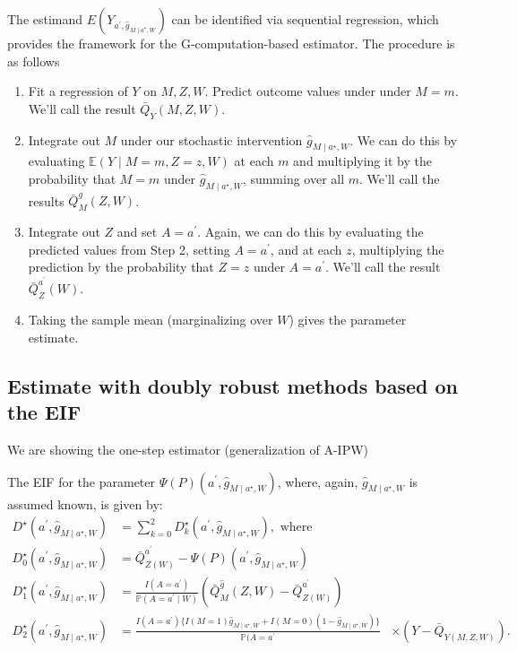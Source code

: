\documentclass[
  12pt,
]{book}
\providecommand{\tightlist}{%
  \setlength{\itemsep}{0pt}\setlength{\parskip}{0pt}}
\theoremstyle{definition}
\theoremstyle{definition}
\theoremstyle{definition}
\renewcommand{\P}{\mathbb{P}}
\newcommand{\E}{\mathbb{E}}
\newcommand{\1}{\mathbbm{1}}
\begin{document}
The estimand \(E(Y_{a^\prime, \hat{g}_{M \mid a^\star,W}})\) can be identified
via sequential regression, which provides the framework for the
G-computation-based estimator. The procedure is as follows

\begin{enumerate}
\def\labelenumi{\arabic{enumi}.}
\tightlist
\item
  Fit a regression of \(Y\) on \(M,Z,W\). Predict outcome values under under
  \(M=m\). We'll call the result \(\bar{Q}_Y(M,Z,W)\).
\item
  Integrate out \(M\) under our stochastic intervention
  \(\hat{g}_{M \mid a^{\star}, W}\). We can do this by evaluating
  \(\E(Y \mid M=m,Z=z,W)\) at each \(m\) and multiplying it by the probability
  that \(M=m\) under \(\hat{g}_{M \mid a^{\star}, W}\), summing over all \(m\).
  We'll call the results \(\bar{Q}^{g}_M(Z,W)\).
\item
  Integrate out \(Z\) and set \(A=a^\prime\). Again, we can do this by evaluating
  the predicted values from Step 2, setting \(A=a^\prime\), and at each \(z\),
  multiplying the prediction by the probability that \(Z=z\) under \(A=a^\prime\).
  We'll call the result \(\bar{Q}^{a^\prime}_Z(W)\).
\item
  Taking the sample mean (marginalizing over \(W\)) gives the parameter
  estimate.
\end{enumerate}

\hypertarget{estimate-with-doubly-robust-methods-based-on-the-eif}{%
\subsection{Estimate with doubly robust methods based on the EIF}\label{estimate-with-doubly-robust-methods-based-on-the-eif}}

We are showing the one-step estimator (generalization of A-IPW)

The EIF for the parameter \(\Psi(P)(a^{\prime}, \hat{g}_{M \mid a^{\star},W})\),
where, again, \(\hat{g}_{M \mid a^{\star}, W}\) is assumed known, is given by:
\begin{align*}
  D^{\star}(a^{\prime}, \hat{g}_{M \mid a^{\star}, W}) &= \sum_{k=0}^2
      D_k^{\star}(a^{\prime}, \hat{g}_{M \mid a^{\star}, W}), \text{ where }\\
  D^{\star}_0(a^{\prime}, \hat{g}_{M \mid a^{\star}, W}) &=
      \bar{Q}^{a^{\prime}}_{Z(W)} -
      \Psi(P)(a^{\prime}, \hat{g}_{M \mid a^{\star}, W})\\
  D^{\star}_1(a^{\prime}, \hat{g}_{M \mid a^{\star}, W}) &=
      \frac{I(A=a^{\prime})}{\P(A=a^{\prime} \mid W)}(\bar{Q}^{\hat{g}}_M(Z,W)
      - \bar{Q}^{a^{\prime}}_{Z(W)})\\
  D^{\star}_2(a^{\prime}, \hat{g}_{M \mid a^{\star}, W}) &=
      \frac{I(A=a^{\prime})\{I(M=1) \hat{g}_{M \mid a^{\star}, W} +
      I(M=0)(1-\hat{g}_{M \mid a^{\star}, W}) \}}{\P(A=a^{\prime}}
      &\times (Y-\bar{Q}_{Y(M,Z,W)}).
\end{align*}
\end{document}
